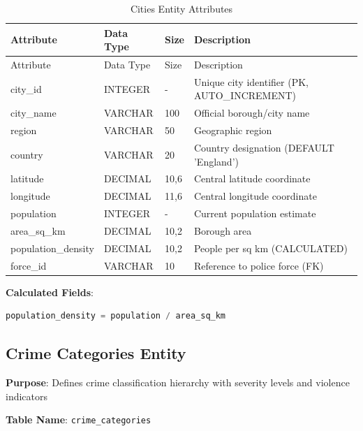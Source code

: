 \documentclass[12pt,a4paper]{article}
\begin{document}
\begin{longtable}{@{}lllp{6cm}@{}}
\caption{Cities Entity Attributes} \\
\toprule
Attribute & Data Type & Size & Description \\
\midrule
\endfirsthead
\toprule
Attribute & Data Type & Size & Description \\
\midrule
\endhead
city\_id & INTEGER & - & Unique city identifier (PK, AUTO\_INCREMENT) \\
city\_name & VARCHAR & 100 & Official borough/city name \\
region & VARCHAR & 50 & Geographic region \\
country & VARCHAR & 20 & Country designation (DEFAULT 'England') \\
latitude & DECIMAL & 10,6 & Central latitude coordinate \\
longitude & DECIMAL & 11,6 & Central longitude coordinate \\
population & INTEGER & - & Current population estimate \\
area\_sq\_km & DECIMAL & 10,2 & Borough area \\
population\_density & DECIMAL & 10,2 & People per sq km (CALCULATED) \\
force\_id & VARCHAR & 10 & Reference to police force (FK) \\
\bottomrule
\end{longtable}

\textbf{Calculated Fields}:
\begin{lstlisting}[language=SQL]
population_density = population / area_sq_km
\end{lstlisting}

\subsection{Crime Categories Entity}

\textbf{Purpose}: Defines crime classification hierarchy with severity levels and violence indicators

\textbf{Table Name}: \texttt{crime\_categories}
\end{document}
